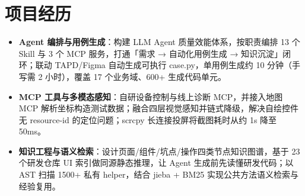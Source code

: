\documentclass[10pt]{article}
\begin{document}




    \section[项目经历]{\makebox[\iconwidth][c]{\color{primarycolor}{\faProjectDiagram}}\quad 项目经历}

    \begin{itemize}
        \item \textbf{Agent 编排与用例生成}：构建 LLM Agent 质量效能体系，按职责编排 13 个 Skill 与 3 个 MCP 服务，打通「需求 → 自动化用例生成 → 知识沉淀」闭环；联动 TAPD/Figma 自动生成可执行 case.py，单用例生成约 10 分钟（手写需 2 小时），覆盖 17 个业务域、600+ 生成代码单元。
        \item \textbf{MCP 工具与多模态感知}：自研设备控制与线上诊断 MCP，并接入地图 MCP 解析坐标构造测试数据；融合四层视觉感知并链式降级，解决自绘控件无 resource-id 的定位问题；scrcpy 长连接投屏将截图耗时从约 1s 降至 50ms。
        \item \textbf{知识工程与语义检索}：设计页面/组件/坑点/操作四类节点知识图谱，基于 23 个研发仓库 UI 索引做同源静态推理，让 Agent 生成前先读懂研发代码；以 AST 扫描 1500+ 私有 helper，结合 jieba + BM25 实现公共方法语义检索与经验复用。
    \end{itemize}

\end{document}
